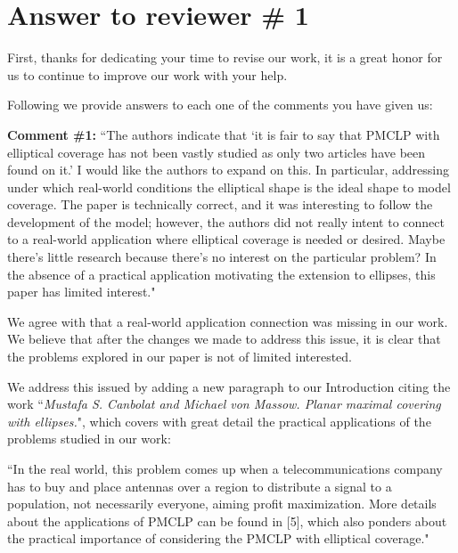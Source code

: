 
	
		
\section*{Answer to reviewer \# 1}
		
		
		First, thanks for dedicating your time to revise our work, it is a great honor for us to continue to improve our work with your help.
			 
		Following we provide answers to each one of the comments you have given us:
		
		\textbf{Comment \#1:} ``The authors indicate that `it is fair to say that PMCLP with elliptical coverage has not been vastly studied as only two articles have been found on it.' I would like the authors to expand on this. In particular, addressing under which real-world conditions the elliptical shape is the ideal shape to model coverage. The paper is technically correct, and it was interesting to follow the development of the model; however, the authors did not really intent to connect to a real-world application where elliptical coverage is needed or desired. Maybe there's little research because there's no interest on the particular problem? In the absence of a practical application motivating the extension to ellipses, this paper has limited interest."
		
		We agree with that a real-world application connection was missing in our work. We believe that after the changes we made to address this issue, it is clear that the problems explored in our paper is not of limited interested.

		We address this issued by adding a new paragraph to our Introduction citing the work ``\textit{Mustafa S. Canbolat and Michael von Massow. Planar maximal covering with ellipses.}", which covers with great detail the practical applications of the problems studied in our work:
		
		``In the real world, this problem comes up when a telecommunications company has to buy and
		place antennas over a region to distribute a signal to a population, not necessarily everyone, aiming
		profit maximization. More details about the applications of PMCLP can be found in [5], which also
		ponders about the practical importance of considering the PMCLP with elliptical coverage."
		
